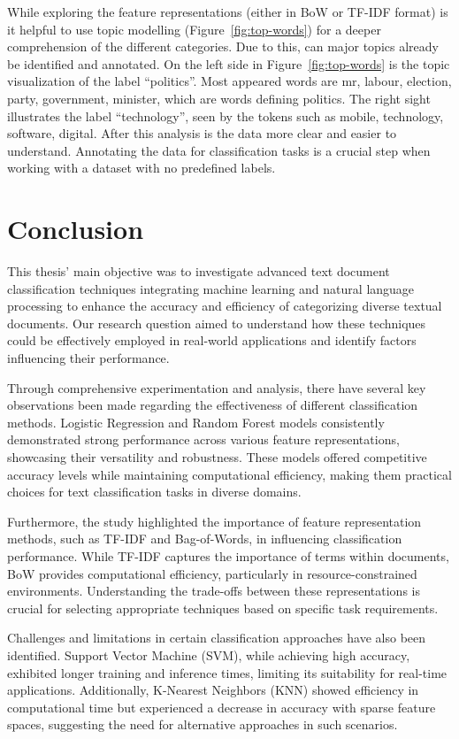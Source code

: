 While exploring the feature representations (either in BoW or TF-IDF format) is it helpful to use topic modelling (Figure~\ref{fig:top-words}) for a deeper comprehension of the different categories. Due to this, can major topics already be identified and annotated. On the left side in Figure~\ref{fig:top-words} is the topic visualization of the label “politics”. Most appeared words are mr, labour, election, party, government, minister, which are words defining politics. The right sight illustrates the label “technology”, seen by the tokens such as mobile, technology, software, digital. After this analysis is the data more clear and easier to understand. Annotating the data for classification tasks is a crucial step when working with a dataset with no predefined labels.

\section{Conclusion}

This thesis' main objective was to investigate advanced text document classification techniques integrating machine learning and natural language processing to enhance the accuracy and efficiency of categorizing diverse textual documents. Our research question aimed to understand how these techniques could be effectively employed in real-world applications and identify factors influencing their performance.

Through comprehensive experimentation and analysis, there have several key observations been made regarding the effectiveness of different classification methods. Logistic Regression and Random Forest models consistently demonstrated strong performance across various feature representations, showcasing their versatility and robustness. These models offered competitive accuracy levels while maintaining computational efficiency, making them practical choices for text classification tasks in diverse domains.

Furthermore, the study highlighted the importance of feature representation methods, such as TF-IDF and Bag-of-Words, in influencing classification performance. While TF-IDF captures the importance of terms within documents, BoW provides computational efficiency, particularly in resource-constrained environments. Understanding the trade-offs between these representations is crucial for selecting appropriate techniques based on specific task requirements.

Challenges and limitations in certain classification approaches have also been identified. Support Vector Machine (SVM), while achieving high accuracy, exhibited longer training and inference times, limiting its suitability for real-time applications. Additionally, K-Nearest Neighbors (KNN) showed efficiency in computational time but experienced a decrease in accuracy with sparse feature spaces, suggesting the need for alternative approaches in such scenarios.

